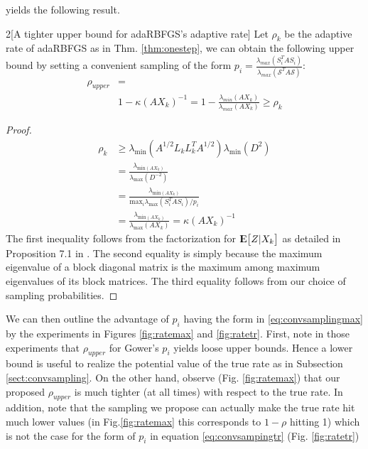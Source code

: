 \documentclass[12pt,conference,compsocconf]{IEEEtran}
\newcommand{\E}{{\rm I\kern-.3em E}}
\begin{document}
yields the following result.
\begin{customthm}{2}[A tighter upper bound for adaRBFGS's adaptive rate]\label{thm:upperbadamax} Let $\rho_k$ be the adaptive rate of adaRBFGS as in Thm. \ref{thm:onestep}, we can obtain the following upper bound by setting a convenient sampling of the form $p_i=\frac{\lambda_{max}(S_i^TAS_i)}{\lambda_{max}(\mathcal{S}^TA\mathcal{S})}$:
\begin{align}\label{eq:upperbmaxada}
\rho_{upper}&=\\ \nonumber
&1-\kappa (AX_k)^{-1}=1-\frac{\lambda_{min}(AX_k)}{\lambda_{max}(AX_k)}\geq \rho_k \nonumber
\end{align}
\begin{proof}
\begin{align}
	\rho_k &\geq \lambda_{\text{min}}(A^{1/2}L_kL_k^TA^{1/2})\lambda_{\text{min}}(D^2)\\ \nonumber
    &=\frac{\lambda_{\text{min}(AX_k)}}{\lambda_{\text{max}}(D^{-2})} \\ \nonumber
    &= \frac{\lambda_{\text{min}(AX_k)}}{\text{max}_i \lambda_{\text{max}}(S_i^TAS_i)/p_i}\\ \nonumber &=\frac{\lambda_{\text{min}(AX_k)}}{\lambda_{\text{max}}(AX_k)} = \kappa(AX_k)^{-1}
\end{align}
The first inequality follows from the factorization for $\E\big[Z|X_k\big]$ as detailed in Proposition 7.1 in \cite{Gower1}. The second equality is simply because the maximum eigenvalue of a block diagonal matrix is the maximum among maximum eigenvalues of its block matrices. The third equality follows from our choice of sampling probabilities.
\end{proof}
\end{customthm}
We can then outline the advantage of $p_i$ having the form in \ref{eq:convsamplingmax} by the experiments in Figures \ref{fig:ratemax} and \ref{fig:ratetr}. First, note in those experiments that $\rho_{upper}$ for Gower's $p_i$ yields loose upper bounds. Hence a lower bound is useful to realize the potential value of the true rate as in Subsection \ref{sect:convsampling}. On the other hand, observe (Fig. \ref{fig:ratemax}) that our proposed $\rho_{upper}$ is much tighter (at all times) with respect to the true rate. In addition, note that the sampling we propose can actually make the true rate hit much lower values (in Fig.\ref{fig:ratemax} this corresponds to $1-\rho$ hitting 1) which is not the case for the form of $p_i$ in equation \ref{eq:convsampingtr} (Fig. \ref{fig:ratetr})\\
\end{document}
